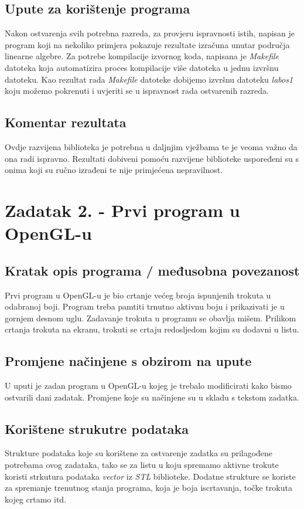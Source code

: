 \documentclass{report}
\begin{document}
\subsection{Upute za korištenje programa}
Nakon ostvarenja svih potrebna razreda, za provjeru ispravnosti istih, napisan je program koji na nekoliko primjera pokazuje rezultate izračuna unutar područja linearne algebre. Za potrebe kompilacije izvornog koda, napisana je \textit{Makefile} datoteka koja automatizira proces kompilacije više datoteka u jednu izvršnu datoteku. Kao rezultat rada \textit{Makefile} datoteke dobijemo izvršnu datoteku \textit{labos1} koju možemo pokrenuti i uvjeriti se u ispravnost rada ostvarenih razreda.

\subsection{Komentar rezultata}
Ovdje razvijena biblioteka je potrebna u daljnjim vježbama te je veoma važno da ona radi ispravno.  Rezultati dobiveni pomoću razvijene biblioteke uspoređeni su s onima koji su ručno izrađeni te nije primjećena nepravilnost.
 
\section{Zadatak 2. - Prvi program u OpenGL-u}
\subsection{Kratak opis programa / međusobna povezanost}
Prvi program u OpenGL-u je bio crtanje većeg broja ispunjenih trokuta u odabranoj boji. Program treba pamtiti trnutno aktivnu boju i prikazivati je u gornjem desnom uglu. Zadavanje trokuta u programu se obavlja mišem. Prilikom crtanja trokuta na ekranu, trokuti se crtaju redosljedom kojim su dodavni u listu.

\subsection{Promjene načinjene s obzirom na upute}
U uputi je zadan program u OpenGL-u kojeg je trebalo modificirati kako bismo ostvarili dani zadatak. Promjene koje su načinjene su u skladu s tekstom zadatka.

\subsection{Korištene strukutre podataka}
Strukture podataka koje su korištene za ostvarenje zadatka su prilagođene potrebama ovog zadataka, tako se za listu u koju spremamo aktivne trokute koristi strkutura podataka \textit{vector} iz \textit{STL} biblioteke. Dodatne strukture se koriste za spremanje trenutnog stanja programa, koja je boja iscrtavanja, točke trokuta kojeg crtamo itd.
\end{document}
